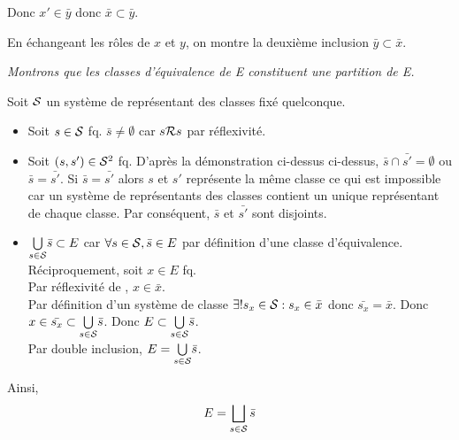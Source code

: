 \documentclass{article}
\renewenvironment{question_kholle}[2][ ]
{
	\subsection{\texorpdfstring{#2}{}}
	\notblank{#1}
	{
		\noindent #1
		\bigbreak
	}
	{}
	\begin{proof}
}
{
	\end{proof}
}
\begin{document}
\begin{question_kholle}
\begin{itemize}[label=\textemdash]
		      Donc $x' \in \bar{y}$ donc $\bar{x} \subset \bar{y}$.

		      En échangeant les rôles de $x$ et $y$, on montre la deuxième inclusion $\bar{y} \subset \bar{x}$.
	\end{itemize}
	\bigbreak

	\textit{Montrons que les classes d'équivalence de E constituent une partition de E.}

	Soit $\mathcal S$ un système de représentant des classes fixé quelconque.

	\begin{itemize}[label=\textemdash]
		\item Soit $s\in \mathcal S$ fq. $\bar{s} \neq \emptyset$ car $s \mathcal R s$ par réflexivité.
		\item Soit $(s, s') \in \mathcal S^2$ fq. D'après la démonstration ci-dessus ci-dessus, $\bar{s} \cap \bar{s'} = \emptyset$ ou $\bar{s} = \bar{s'}$. Si $\bar{s} = \bar{s'}$ alors $s$ et $s'$ représente la même classe ce qui est impossible car un système de représentants des classes contient un unique représentant de chaque classe. Par conséquent, $\bar{s}$ et $\bar{s'}$ sont disjoints.
		\item $\underset{s \in \mathcal S}{\bigcup} \bar{s} \subset E$ car $\forall s \in \mathcal S, \bar{s} \in E$ par définition d'une classe d'équivalence. \\
		      Réciproquement, soit $x \in E$ fq. \\
		      Par réflexivité de \Rel, $x \in \bar{x}$. \\
		      Par définition d'un système de classe $\exists ! s_x \in \mathcal S : s_x \in \bar{x}$ donc $\bar{s_x} = \bar{x}$. Donc $x \in \bar{s_x} \subset \underset{s \in \mathcal S}{\bigcup} \bar{s}$. Donc $E \subset \underset{s \in \mathcal S}{\bigcup} \bar{s}$. \\
		      Par double inclusion, $E = \underset{s \in \mathcal S}{\bigcup} \bar{s}$.
	\end{itemize}

	Ainsi,
	\begin{equation}
		E = \bigsqcup_{s \in \mathcal S} \bar{s}
	\end{equation}

\end{question_kholle}
\end{document}
